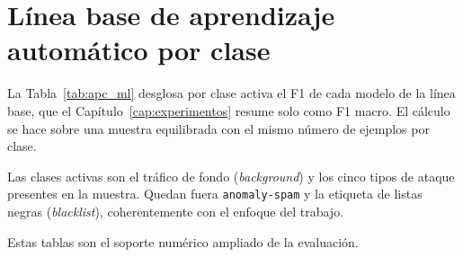 \section{Línea base de aprendizaje automático por clase}
\label{sec:apc_ml}

La Tabla~\ref{tab:apc_ml} desglosa por clase activa el F1 de cada modelo de la línea base, que el Capítulo~\ref{cap:experimentos} resume solo como F1 macro. El cálculo se hace sobre una muestra equilibrada con el mismo número de ejemplos por clase.

\begin{table}[ht]
\centering
{}
\caption{F1 por clase activa de la línea base de aprendizaje automático (muestra equilibrada, 2\,778 ejemplos por clase). Recoge los cuatro modelos de la comparación principal de la memoria.}
\label{tab:apc_ml}
\end{table}

Las clases activas son el tráfico de fondo (\emph{background}) y los cinco tipos de ataque presentes en la muestra. Quedan fuera \texttt{anomaly-spam} y la etiqueta de listas negras (\emph{blacklist}), coherentemente con el enfoque del trabajo.

Estas tablas son el soporte numérico ampliado de la evaluación.
